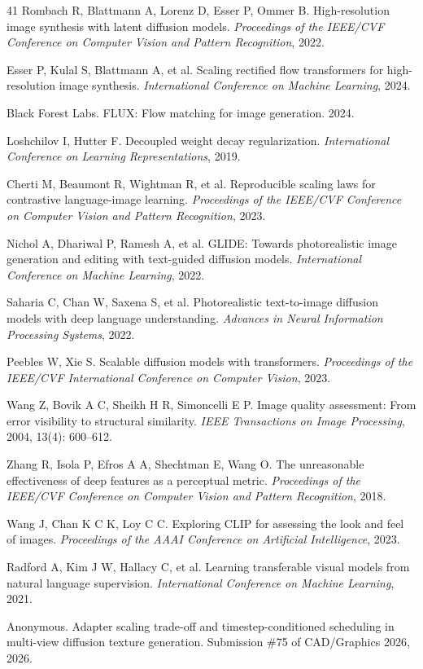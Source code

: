 \documentclass[times,twocolumn,final]{elsarticle}
\providecommand{\DIFadd}[1]{{\protect\color{blue} \sf #1}} %
\providecommand{\DIFaddbegin}{} %
\providecommand{\DIFaddend}{} %
\newcommand{\DIFaddincludegraphics}[2][]{{\color{blue}\fbox{\DIFOincludegraphics[#1]{#2}}}} %
\DeclareRobustCommand{\DIFaddbegin}{\DIFOaddbegin \let\includegraphics\DIFaddincludegraphics} %
\DeclareRobustCommand{\DIFaddend}{\DIFOaddend \let\includegraphics\DIFOincludegraphics} %
\begin{document}
\begin{thebibliography}{41}
Rombach R, Blattmann A, Lorenz D, Esser P, Ommer B. High-resolution image synthesis with latent diffusion models. \textit{Proceedings of the IEEE/CVF Conference on Computer Vision and Pattern Recognition}, 2022.

Esser P, Kulal S, Blattmann A, et al. Scaling rectified flow transformers for high-resolution image synthesis. \textit{International Conference on Machine Learning}, 2024.

Black Forest Labs. FLUX: Flow matching for image generation. 2024.

Loshchilov I, Hutter F. Decoupled weight decay regularization. \textit{International Conference on Learning Representations}, 2019.

Cherti M, Beaumont R, Wightman R, et al. Reproducible scaling laws for contrastive language-image learning. \textit{Proceedings of the IEEE/CVF Conference on Computer Vision and Pattern Recognition}, 2023.

Nichol A, Dhariwal P, Ramesh A, et al. GLIDE: Towards photorealistic image generation and editing with text-guided diffusion models. \textit{International Conference on Machine Learning}, 2022.

Saharia C, Chan W, Saxena S, et al. Photorealistic text-to-image diffusion models with deep language understanding. \textit{Advances in Neural Information Processing Systems}, 2022.

Peebles W, Xie S. Scalable diffusion models with transformers. \textit{Proceedings of the IEEE/CVF International Conference on Computer Vision}, 2023.
\DIFaddbegin 

\DIFadd{Wang Z, Bovik A C, Sheikh H R, Simoncelli E P. Image quality assessment: From error visibility to structural similarity. \textit{IEEE Transactions on Image Processing}, 2004, 13(4): 600--612.
}

\DIFadd{Zhang R, Isola P, Efros A A, Shechtman E, Wang O. The unreasonable effectiveness of deep features as a perceptual metric. \textit{Proceedings of the IEEE/CVF Conference on Computer Vision and Pattern Recognition}, 2018.
}

\DIFadd{Wang J, Chan K C K, Loy C C. Exploring CLIP for assessing the look and feel of images. \textit{Proceedings of the AAAI Conference on Artificial Intelligence}, 2023.
}

\DIFadd{Radford A, Kim J W, Hallacy C, et al. Learning transferable visual models from natural language supervision. \textit{International Conference on Machine Learning}, 2021.
}

\DIFadd{Anonymous. Adapter scaling trade-off and timestep-conditioned scheduling in multi-view diffusion texture generation. Submission \#75 of CAD/Graphics 2026, 2026.
}\DIFaddend 

\end{thebibliography}
\end{document}

